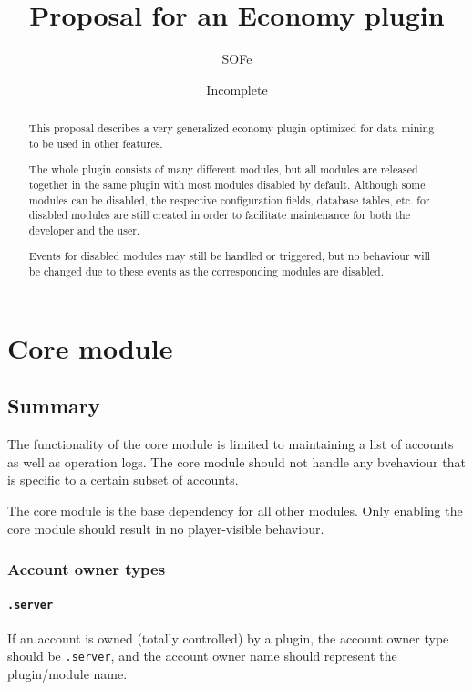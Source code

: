 \documentclass{report}
\title{Proposal for an Economy plugin}
\date{Incomplete}
\author{SOFe}
\begin{document}
	\maketitle

	\begin{abstract}
		This proposal describes a very generalized economy plugin optimized for data mining to be used in other features.

		The whole plugin consists of many different modules, but all modules are released together in the same plugin with most modules disabled by default.
		Although some modules can be disabled, the respective configuration fields, database tables, etc. for disabled modules are still created
		in order to facilitate maintenance for both the developer and the user.

		Events for disabled modules may still be handled or triggered,
		but no behaviour will be changed due to these events as the corresponding modules are disabled.
	\end{abstract}

	\setcounter{tocdepth}{3}
	\tableofcontents

	\newpage

	\chapter{Core module}
		\section{Summary}

			The functionality of the core module is limited to maintaining a list of accounts as well as operation logs.
			The core module should not handle any bvehaviour that is specific to a certain subset of accounts.

			The core module is the base dependency for all other modules. Only enabling the core module should result in no player-visible behaviour.

			\subsection{Account owner types}
				\subsubsection{\texttt{.server}}
					If an account is owned (totally controlled) by a plugin,
					the account owner type should be \texttt{.server},
					and the account owner name should represent the plugin/module name.
\end{document}
